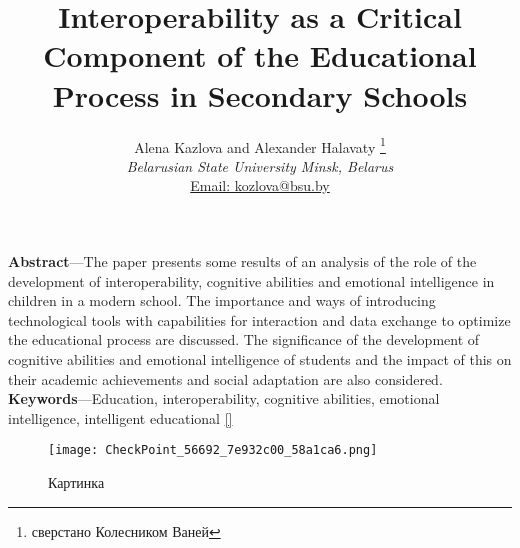 \documentclass[twocolumn]{article}
\title{\textbf{Interoperability as a Critical Component of the Educational Process in Secondary Schools}}
\author{ Alena Kazlova and Alexander Halavaty \thanks{сверстано Колесником Ваней} \\ \textit{Belarusian State University Minsk, Belarus}\\ \underline{Email: kozlova@bsu.by}}
\begin{document}
\maketitle
 \textbf{Abstract}—The paper presents some results of an analysis of the role of the development of interoperability, cognitive abilities and emotional intelligence in children in a modern school. The importance and ways of introducing technological tools with capabilities for interaction and data exchange to optimize the educational process are discussed. The significance of the development of cognitive abilities and emotional intelligence of students and the impact of this on their academic achievements and social adaptation are also considered.\\ \textbf{Keywords}—Education, interoperability, cognitive abilities, emotional intelligence, intelligent educational 
 \ref{}
\begin{figure}
     \centering
     \texttt{[image: CheckPoint\_56692\_7e932c00\_58a1ca6.png]}
     \caption{Картинка}
     \label{fig:placeholder}
 \end{figure}
\end{document}

